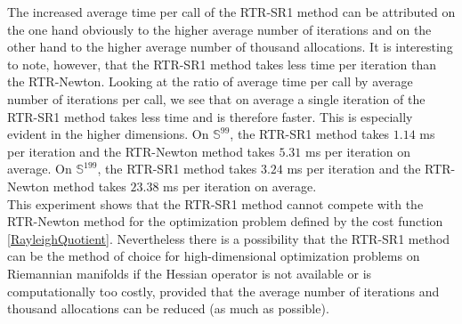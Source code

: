 The increased average time per call of the RTR-SR1 method can be attributed on the one hand obviously to the higher average number of iterations and on the other hand to the higher average number of thousand allocations. It is interesting to note, however, that the RTR-SR1 method takes less time per iteration than the RTR-Newton. Looking at the ratio of average time per call by average number of iterations per call, we see that on average a single iteration of the RTR-SR1 method takes less time and is therefore faster. This is especially evident in the higher dimensions. On $\mathbb{S}^{99}$, the RTR-SR1 method takes $1.14$ ms per iteration and the RTR-Newton method takes $5.31$ ms per iteration on average. On $\mathbb{S}^{199}$, the RTR-SR1 method takes $3.24$ ms per iteration and the RTR-Newton method takes $23.38$ ms per iteration on average. \\

This experiment shows that the RTR-SR1 method cannot compete with the RTR-Newton method for the optimization problem defined by the cost function \cref{RayleighQuotient}. Nevertheless there is a possibility that the RTR-SR1 method can be the method of choice for high-dimensional optimization problems on Riemannian manifolds if the Hessian operator is not available or is computationally too costly, provided that the average number of iterations and thousand allocations can be reduced (as much as possible).
